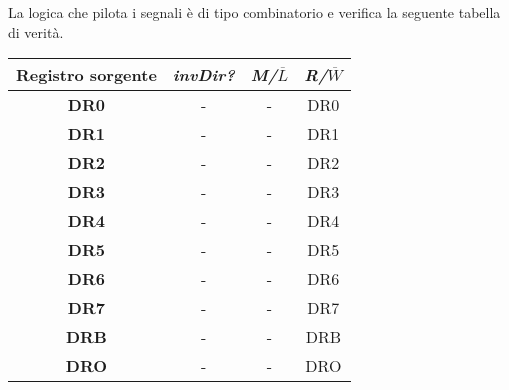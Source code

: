 La logica che pilota i segnali è di tipo combinatorio e verifica la seguente tabella di verità.
\begin{table}[H]
	\centering
	\fontsize{10}{18}\selectfont
	\begin{tabular}{|p{25mm}|p{5mm}|p{5mm}|p{25mm}|}
		\hline
		\multicolumn{1}{|c|}{\textbf{Registro sorgente}} &
		\multicolumn{1}{c|}{\textit{invDir?}} &
		\multicolumn{1}{|c|}{\textit{M/$\overline{L}$}} &
		\multicolumn{1}{c|}{\textit{R/$\overline{W}$}}\\
		
		\hline
		\multicolumn{1}{|c|}{\textbf{DR0}} &
		\multicolumn{1}{c|}{-} &
		\multicolumn{1}{|c|}{-} &
		\multicolumn{1}{c|}{DR0}\\
		
		\hline
		\multicolumn{1}{|c|}{\textbf{DR1}} &
		\multicolumn{1}{c|}{-} &
		\multicolumn{1}{|c|}{-} &
		\multicolumn{1}{c|}{DR1}\\
		
		\hline
		\multicolumn{1}{|c|}{\textbf{DR2}} &
		\multicolumn{1}{c|}{-} &
		\multicolumn{1}{|c|}{-} &
		\multicolumn{1}{c|}{DR2}\\
		
		\hline
		\multicolumn{1}{|c|}{\textbf{DR3}} &
		\multicolumn{1}{c|}{-} &
		\multicolumn{1}{|c|}{-} &
		\multicolumn{1}{c|}{DR3}\\
		
		\hline
		\multicolumn{1}{|c|}{\textbf{DR4}} &
		\multicolumn{1}{c|}{-} &
		\multicolumn{1}{|c|}{-} &
		\multicolumn{1}{c|}{DR4}\\
		
		\hline
		\multicolumn{1}{|c|}{\textbf{DR5}} &
		\multicolumn{1}{c|}{-} &
		\multicolumn{1}{|c|}{-} &
		\multicolumn{1}{c|}{DR5}\\
		
		\hline
		\multicolumn{1}{|c|}{\textbf{DR6}} &
		\multicolumn{1}{c|}{-} &
		\multicolumn{1}{|c|}{-} &
		\multicolumn{1}{c|}{DR6}\\
		
		\hline
		\multicolumn{1}{|c|}{\textbf{DR7}} &
		\multicolumn{1}{c|}{-} &
		\multicolumn{1}{|c|}{-} &
		\multicolumn{1}{c|}{DR7}\\
		
		\hline
		\multicolumn{1}{|c|}{\textbf{DRB}} &
		\multicolumn{1}{c|}{-} &
		\multicolumn{1}{|c|}{-} &
		\multicolumn{1}{c|}{DRB}\\
		
		\hline
		\multicolumn{1}{|c|}{\textbf{DRO}} &
		\multicolumn{1}{c|}{-} &
		\multicolumn{1}{|c|}{-} &
		\multicolumn{1}{c|}{DRO}\\
		

\end{tabular}
\end{table}
